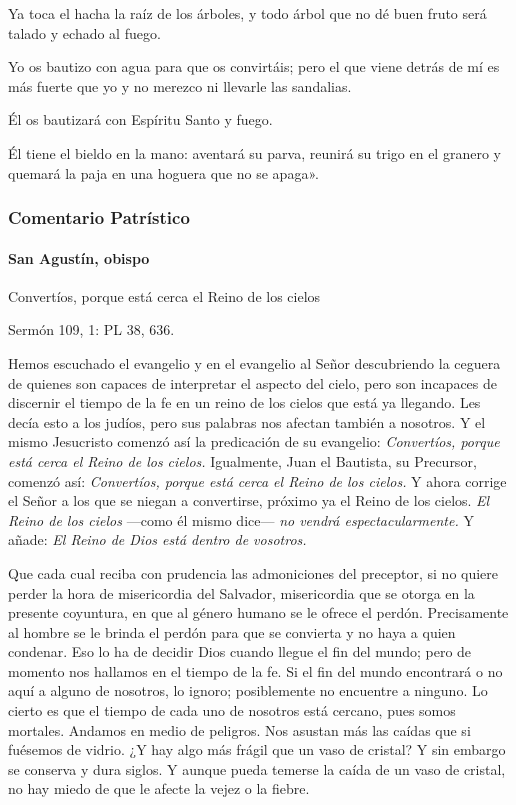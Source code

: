 \documentclass[]{article}
\let\oldparagraph\paragraph
\renewcommand{\paragraph}[1]{\oldparagraph{#1}\mbox{}}
\begin{document}
Ya toca el hacha la raíz de los árboles, y todo árbol que no dé buen
fruto será talado y echado al fuego.

Yo os bautizo con agua para que os convirtáis; pero el que viene detrás
de mí es más fuerte que yo y no merezco ni llevarle las sandalias.

Él os bautizará con Espíritu Santo y fuego.

Él tiene el bieldo en la mano: aventará su parva, reunirá su trigo en el
granero y quemará la paja en una hoguera que no se
apaga».\protect\hypertarget{_Toc448662722}{}{\protect\hypertarget{_Toc448690241}{}{\protect\hypertarget{_Toc448708264}{}{\protect\hypertarget{_Toc448709350}{}{\protect\hypertarget{_Toc449554352}{}{}}}}}

\subsubsection{Comentario Patrístico}\label{comentario-patruxedstico-1}

\paragraph{San Agustín, obispo}\label{san-agustuxedn-obispo}

Convertíos, porque está cerca el Reino de los cielos

Sermón 109, 1: PL 38, 636.

Hemos escuchado el evangelio y en el evangelio al Señor descubriendo la
ceguera de quienes son capaces de interpretar el aspecto del cielo, pero
son incapaces de discernir el tiempo de la fe en un reino de los cielos
que está ya llegando. Les decía esto a los judíos, pero sus palabras nos
afectan también a nosotros. Y el mismo Jesucristo comenzó así la
predicación de su evangelio: \emph{Convertíos, porque está cerca el
Reino de los cielos.} Igualmente, Juan el Bautista, su Precursor,
comenzó así: \emph{Convertíos, porque está cerca el Reino de los
cielos.} Y ahora corrige el Señor a los que se niegan a convertirse,
próximo ya el Reino de los cielos. \emph{El Reino de los cielos} ---como
él mismo dice--- \emph{no vendrá espectacularmente.} Y añade: \emph{El
Reino de Dios está dentro de vosotros.}

Que cada cual reciba con prudencia las admoniciones del preceptor, si no
quiere perder la hora de misericordia del Salvador, misericordia que se
otorga en la presente coyuntura, en que al género humano se le ofrece el
perdón. Precisamente al hombre se le brinda el perdón para que se
convierta y no haya a quien condenar. Eso lo ha de decidir Dios cuando
llegue el fin del mundo; pero de momento nos hallamos en el tiempo de la
fe. Si el fin del mundo encontrará o no aquí a alguno de nosotros, lo
ignoro; posiblemente no encuentre a ninguno. Lo cierto es que el tiempo
de cada uno de nosotros está cercano, pues somos mortales. Andamos en
medio de peligros. Nos asustan más las caídas que si fuésemos de vidrio.
¿Y hay algo más frágil que un vaso de cristal? Y sin embargo se conserva
y dura siglos. Y aunque pueda temerse la caída de un vaso de cristal, no
hay miedo de que le afecte la vejez o la fiebre.
\end{document}
